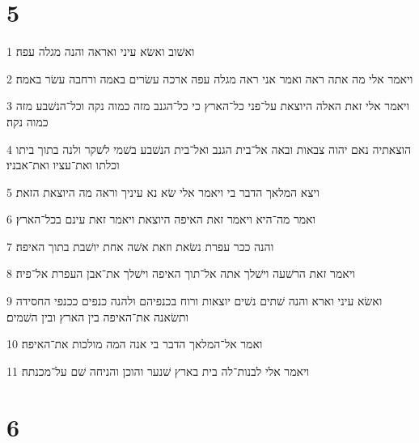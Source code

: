 \chapter{5}

\par 1 ואשׁוב ואשׂא עיני ואראה והנה מגלה עפה׃
\par 2 ויאמר אלי מה אתה ראה ואמר אני ראה מגלה עפה ארכה עשׂרים באמה ורחבה עשׂר באמה׃
\par 3 ויאמר אלי זאת האלה היוצאת על־פני כל־הארץ כי כל־הגנב מזה כמוה נקה וכל־הנשׁבע מזה כמוה נקה׃
\par 4 הוצאתיה נאם יהוה צבאות ובאה אל־בית הגנב ואל־בית הנשׁבע בשׁמי לשׁקר ולנה בתוך ביתו וכלתו ואת־עציו ואת־אבניו׃
\par 5 ויצא המלאך הדבר בי ויאמר אלי שׂא נא עיניך וראה מה היוצאת הזאת׃
\par 6 ואמר מה־היא ויאמר זאת האיפה היוצאת ויאמר זאת עינם בכל־הארץ׃
\par 7 והנה ככר עפרת נשׂאת וזאת אשׁה אחת יושׁבת בתוך האיפה׃
\par 8 ויאמר זאת הרשׁעה וישׁלך אתה אל־תוך האיפה וישׁלך את־אבן העפרת אל־פיה׃
\par 9 ואשׂא עיני וארא והנה שׁתים נשׁים יוצאות ורוח בכנפיהם ולהנה כנפים ככנפי החסידה ותשׂאנה את־האיפה בין הארץ ובין השׁמים׃
\par 10 ואמר אל־המלאך הדבר בי אנה המה מולכות את־האיפה׃
\par 11 ויאמר אלי לבנות־לה בית בארץ שׁנער והוכן והניחה שׁם על־מכנתה׃

\chapter{6}

